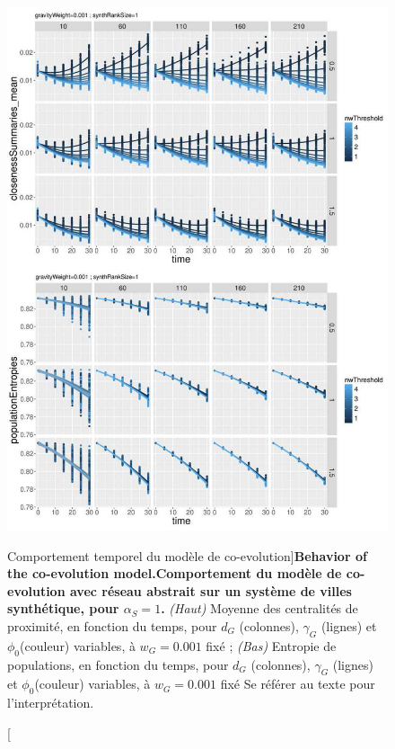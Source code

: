 \begin{figure}
\includegraphics[width=\linewidth]{Figures/Final/A-macrocoevol-behavior-time.jpg}
\caption[Behavior of the co-evolution model][Comportement temporel du modèle de co-evolution]{\textbf{Behavior of the co-evolution model.}\label{fig:macrocoevol:behavior-time}}{\textbf{Comportement du modèle de co-evolution avec réseau abstrait sur un système de villes synthétique, pour $\alpha_S = 1$.} \textit{(Haut)} Moyenne des centralités de proximité, en fonction du temps, pour $d_G$ (colonnes), $\gamma_G$ (lignes) et $\phi_0$(couleur) variables, à $w_G = 0.001$ fixé ; \textit{(Bas)} Entropie de populations, en fonction du temps, pour $d_G$ (colonnes), $\gamma_G$ (lignes) et $\phi_0$(couleur) variables, à $w_G = 0.001$ fixé Se référer au texte pour l'interprétation.\label{fig:app:macrocoevol:behavior-time}}
\end{figure}



